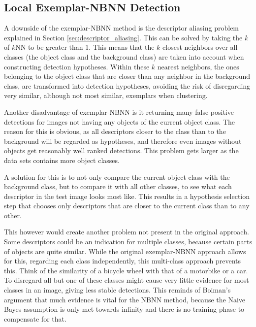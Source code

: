 

\subsection{Local Exemplar-NBNN Detection} %
\label{sec:local_nbnn_detection}
A downside of the exemplar-NBNN method is the descriptor aliasing problem explained in Section \ref{sec:descriptor_aliasing}. This can be solved by taking the $k$ of $k$NN to be greater than 1. This means that the $k$ closest neighbors over all classes (the object class and the background class) are taken into account when constructing detection hypotheses. Within these $k$ nearest neighbors, the ones belonging to the object class that are closer than any neighbor in the background class, are transformed into detection hypotheses, avoiding the risk of disregarding very similar, although not most similar, exemplars when clustering.


Another disadvantage of exemplar-NBNN is it returning many false positive detections for images not having any objects of the current object class. The reason for this is obvious, as all descriptors closer to the class than to the background will be regarded as hypotheses, and therefore even images without objects get reasonably well ranked detections. This problem gets larger as the data sets contains more object classes.

A solution for this is to not only compare the current object class with the background class, but to compare it with all other classes, to see what each descriptor in the test image looks most like. This results in a hypothesis selection step that chooses only descriptors that are closer to the current class than to any other.

This however would create another problem not present in the original approach. Some descriptors could be an indication for multiple classes, because certain parts of objects are quite similar. While the original exemplar-NBNN approach allows for this, regarding each class independently, this multi-class approach prevents this. Think of the similarity of a bicycle wheel with that of a motorbike or a car. To disregard all but one of these classes might cause very little evidence for most classes in an image, giving less stable detections. This reminds of Boiman's argument that much evidence is vital for the NBNN method, because the Naive Bayes assumption is only met towards infinity and there is no training phase to compensate for that.\cite{boiman2008defense}

